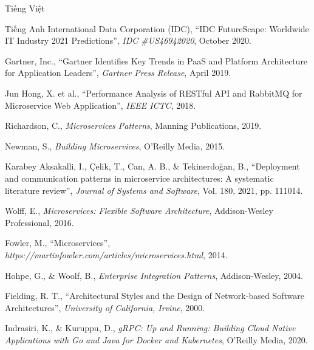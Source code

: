 \documentclass{uetgraduation}
\begin{document}
\begin{thebibliography}{9}
    \begin{bibsection}{Tiếng Việt}
    \end{bibsection}

    \begin{bibsection}{Tiếng Anh}
        International Data Corporation (IDC),
        ``IDC FutureScape: Worldwide IT Industry 2021 Predictions'',
        \textit{IDC \#US46942020},
        October 2020.

        Gartner, Inc.,
        ``Gartner Identifies Key Trends in PaaS and Platform Architecture for Application Leaders'',
        \textit{Gartner Press Release},
        April 2019.

        Jun Hong, X. et al.,
        ``Performance Analysis of RESTful API and RabbitMQ for Microservice Web Application'',
        \textit{IEEE ICTC},
        2018.

        Richardson, C.,
        \textit{Microservices Patterns},
        Manning Publications, 2019.

        Newman, S.,
        \textit{Building Microservices},
        O'Reilly Media, 2015.

        Karabey Aksakalli, I., Çelik, T., Can, A. B., \& Tekinerdoğan, B.,
        ``Deployment and communication patterns in microservice architectures: A systematic literature review'',
        \textit{Journal of Systems and Software},
        Vol. 180, 2021, pp. 111014.

        Wolff, E.,
        \textit{Microservices: Flexible Software Architecture},
        Addison-Wesley Professional, 2016.

        Fowler, M.,
        ``Microservices'',
        \textit{https://martinfowler.com/articles/microservices.html},
        2014.

        Hohpe, G., \& Woolf, B.,
        \textit{Enterprise Integration Patterns},
        Addison-Wesley, 2004.

        Fielding, R. T.,
        ``Architectural Styles and the Design of Network-based Software Architectures'',
        \textit{University of California, Irvine},
        2000.

        Indrasiri, K., \& Kuruppu, D.,
        \textit{gRPC: Up and Running: Building Cloud Native Applications with Go and Java for Docker and Kubernetes},
        O'Reilly Media, 2020.


\end{bibsection}
\end{thebibliography}
\end{document}
